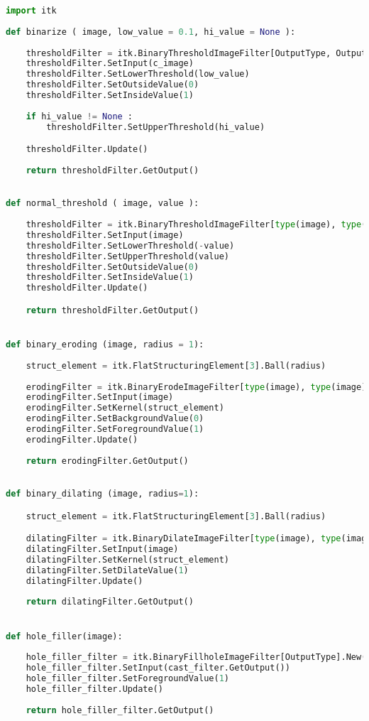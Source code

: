 \documentclass{standalone}
\begin{document}
\lstset{style=python}
	\begin{lstlisting}[language = python, caption = Wrapped ITK filters, label =multimap_registration]
import itk
	
def binarize ( image, low_value = 0.1, hi_value = None ):
    
    thresholdFilter = itk.BinaryThresholdImageFilter[OutputType, OutputType].New()
    thresholdFilter.SetInput(c_image)
    thresholdFilter.SetLowerThreshold(low_value)
    thresholdFilter.SetOutsideValue(0)
    thresholdFilter.SetInsideValue(1)
        
    if hi_value != None : 
        thresholdFilter.SetUpperThreshold(hi_value)

    thresholdFilter.Update()
    
    return thresholdFilter.GetOutput() 
	

def normal_threshold ( image, value ):
    
    thresholdFilter = itk.BinaryThresholdImageFilter[type(image), type(image)].New()
    thresholdFilter.SetInput(image)
    thresholdFilter.SetLowerThreshold(-value)
    thresholdFilter.SetUpperThreshold(value)
    thresholdFilter.SetOutsideValue(0)
    thresholdFilter.SetInsideValue(1)
    thresholdFilter.Update()

    return thresholdFilter.GetOutput()


def binary_eroding (image, radius = 1):
    
    struct_element = itk.FlatStructuringElement[3].Ball(radius)
    
    erodingFilter = itk.BinaryErodeImageFilter[type(image), type(image), type(struct_element)].New()
    erodingFilter.SetInput(image)
    erodingFilter.SetKernel(struct_element)
    erodingFilter.SetBackgroundValue(0)
    erodingFilter.SetForegroundValue(1)
    erodingFilter.Update()
    
    return erodingFilter.GetOutput()

    
def binary_dilating (image, radius=1):

    struct_element = itk.FlatStructuringElement[3].Ball(radius)

    dilatingFilter = itk.BinaryDilateImageFilter[type(image), type(image), type(struct_element)].New()
    dilatingFilter.SetInput(image)
    dilatingFilter.SetKernel(struct_element)
    dilatingFilter.SetDilateValue(1) 
    dilatingFilter.Update()
    
    return dilatingFilter.GetOutput()


def hole_filler(image):
    
    hole_filler_filter = itk.BinaryFillholeImageFilter[OutputType].New()
    hole_filler_filter.SetInput(cast_filter.GetOutput())
    hole_filler_filter.SetForegroundValue(1)
    hole_filler_filter.Update()
    
    return hole_filler_filter.GetOutput()

\end{lstlisting}
\end{document}
